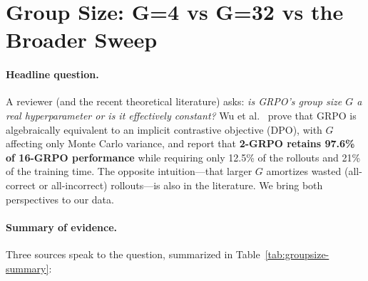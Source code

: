 \section{Group Size: G=4 vs G=32 vs the Broader Sweep}
\label{sec:group-size}

\paragraph{Headline question.}
A reviewer (and the recent theoretical literature) asks: \emph{is GRPO's
group size $G$ a real hyperparameter or is it effectively constant?}
Wu et al.~\cite{wu2025grpo_dpo} prove that GRPO is algebraically
equivalent to an implicit contrastive objective (DPO), with $G$ affecting
only Monte Carlo variance, and report that \textbf{2-GRPO retains
97.6\% of 16-GRPO performance} while requiring only 12.5\% of the
rollouts and 21\% of the training time. The opposite intuition---that
larger $G$ amortizes wasted (all-correct or all-incorrect) rollouts---is
also in the literature. We bring both perspectives to our data.

\paragraph{Summary of evidence.}
Three sources speak to the question, summarized in
Table~\ref{tab:groupsize-summary}:

